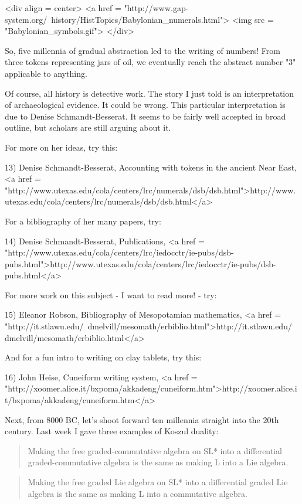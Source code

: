 <div align = center>
<a href = "http://www.gap-system.org/~history/HistTopics/Babylonian_numerals.html">
<img src = "Babylonian_symbols.gif">
</div>


So, five millennia of gradual abstraction led to the writing of numbers!
From three tokens representing jars of oil, we eventually reach the 
abstract number "3" applicable to anything.  

Of course, all history is detective work.  The story I just told is 
an interpretation of archaeological evidence.  It could be wrong.  
This particular interpretation is due to Denise Schmandt-Besserat.  
It seems to be fairly well accepted in broad outline, but scholars 
are still arguing about it.  

For more on her ideas, try this:

13) Denise Schmandt-Besserat, Accounting with tokens in the 
ancient Near East, 
<a href = "http://www.utexas.edu/cola/centers/lrc/numerals/dsb/dsb.html">http://www.utexas.edu/cola/centers/lrc/numerals/dsb/dsb.html</a>

For a bibliography of her many papers, try:

14) Denise Schmandt-Besserat, Publications,
<a href = "http://www.utexas.edu/cola/centers/lrc/iedocctr/ie-pubs/dsb-pubs.html">http://www.utexas.edu/cola/centers/lrc/iedocctr/ie-pubs/dsb-pubs.html</a>

For more work on this subject - I want to read more! - try:

15) Eleanor Robson, Bibliography of Mesopotamian mathematics,
<a href = "http://it.stlawu.edu/~dmelvill/mesomath/erbiblio.html">http://it.stlawu.edu/~dmelvill/mesomath/erbiblio.html</a>

And for a fun intro to writing on clay tablets, try this:

16) John Heise, Cuneiform writing system,
<a href = "http://xoomer.alice.it/bxpoma/akkadeng/cuneiform.htm">http://xoomer.alice.it/bxpoma/akkadeng/cuneiform.htm</a>

Next, from 8000 BC, let's shoot forward ten millennia straight into the 20th
century.  Last week I gave three examples of Koszul duality:

\begin{quote}
 Making the free graded-commutative algebra on SL* into a differential
 graded-commutative algebra is the same as making L into a Lie algebra.
\end{quote}
    

\begin{quote}
 Making the free graded Lie algebra on SL* into a differential
 graded Lie algebra is the same as making L into a commutative algebra.
\end{quote}
    

